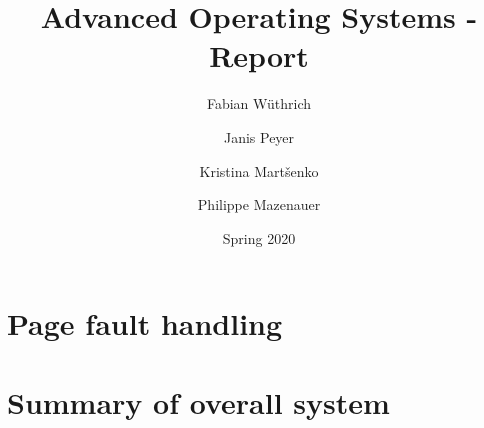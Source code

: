 \documentclass[11pt,a4paper]{report}
\begin{document}
\title{Advanced Operating Systems - Report}
\author{
Fabian W{\" u}thrich
\and
Janis Peyer 
\and
Kristina Mart{\v s}enko
\and
Philippe Mazenauer
}
\date{Spring 2020}

\maketitle

\tableofcontents

\listoffigures

\listoftables

\clearpage









\chapter{Page fault handling}














\chapter{Summary of overall system}

\appendix



\printbibliography
\end{document}
